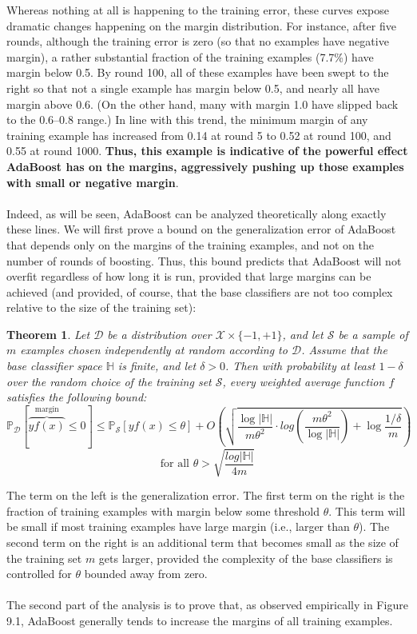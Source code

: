 \documentclass[twoside]{article}
\newcounter{lecnum}
\newtheorem{theorem}{Theorem}[lecnum]
\begin{document}
Whereas nothing at all is happening to the training error, these curves expose dramatic changes happening on
the margin distribution. For instance, after five rounds, although the training error is zero
(so that no examples have negative margin), a rather substantial fraction of the training
examples (7.7\%) have margin below 0.5. By round 100, all of these examples have been
swept to the right so that not a single example has margin below 0.5, and nearly all have
margin above 0.6. (On the other hand, many with margin 1.0 have slipped back to the 0.6–0.8
range.) In line with this trend, the minimum margin of any training example has increased
from 0.14 at round 5 to 0.52 at round 100, and 0.55 at round 1000.
\textbf{Thus, this example is indicative of the powerful effect AdaBoost has on the margins,
aggressively pushing up those examples with small or negative margin}. \\ \\
Indeed, as will be seen, AdaBoost can be analyzed theoretically along exactly these lines.
We will first prove a bound on the generalization error of AdaBoost that depends only on the margins of the training examples, and not on the number of rounds of boosting. Thus, this bound predicts that AdaBoost will not overfit regardless
of how long it is run, provided that large margins can be achieved (and provided, of course,
that the base classifiers are not too complex relative to the size of the training set):

\begin{theorem}
Let $\mathcal{D}$ be a distribution over $\mathcal{X} \times \{ -1, +1\}$, and let $\mathcal{S}$ be a sample of $m$ examples chosen independently at random according to $\mathcal{D}$. Assume that the base classifier space
$\mathbb{H}$ is finite, and let $\delta > 0$. Then with probability at least $1 -  \delta$ over the random choice of the
training set $\mathcal{S}$, every weighted average function $f$ satisfies the following bound:
$$\mathbb{P}_{\mathcal{D}}[\overbrace{yf(x)}^\text{margin} \leq 0] \leq  \mathbb{P}_{\mathcal{S}}[yf(x) \leq \theta] + O(\sqrt{\dfrac{\log{\mathbb{|H|}}}{m \theta^2} \cdot log(\dfrac{m \theta^2}{\log{\mathbb{|H|}}} )+ \log{\dfrac{1 / \delta}{m}} }) 
$$
$$\text{for all } \theta > \sqrt{\dfrac{log{\mathbb{|H|}}}{4m}}$$
\end{theorem}

The term on the left is the generalization error. The first term on the right
is the fraction of training examples with margin below some threshold $\theta$. This term will be
small if most training examples have large margin (i.e., larger than $\theta$). The second term on
the right is an additional term that becomes small as the size of the training set $m$ gets larger,
provided the complexity of the base classifiers is controlled for $\theta$ bounded away from zero. \\ \\ The second part of the analysis is to prove that, as observed empirically in Figure 9.1, AdaBoost generally tends to increase the margins of all training examples. 
\end{document}
